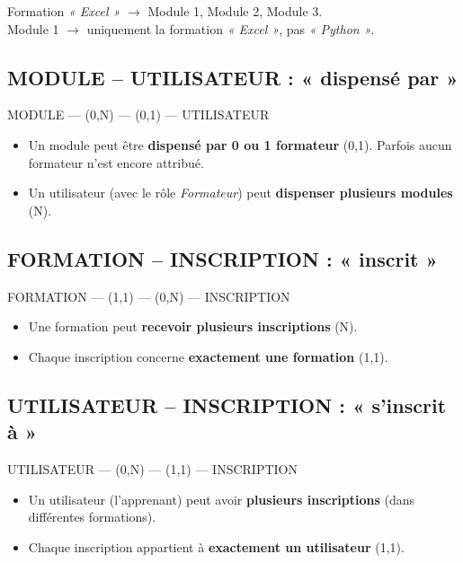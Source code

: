 \documentclass[12pt,a4paper]{article}
\begin{document}
\begin{exemplebox}
    \small
    Formation \textit{« Excel »} \(\rightarrow\) Module 1, Module 2, Module 3. \\
    Module 1 \(\rightarrow\) uniquement la formation \textit{« Excel »}, pas \textit{« Python »}.
\end{exemplebox}

\subsection{MODULE -- UTILISATEUR : « dispensé par »}


MODULE --- (0,N) --- (0,1) --- UTILISATEUR


\begin{itemize}
    \item Un module peut être \textbf{dispensé par 0 ou 1 formateur} (0,1). Parfois aucun formateur n'est encore attribué.
    \item Un utilisateur (avec le rôle \textit{Formateur}) peut \textbf{dispenser plusieurs modules} (N).
\end{itemize}

\subsection{FORMATION -- INSCRIPTION : « inscrit »}


FORMATION --- (1,1) --- (0,N) --- INSCRIPTION


\begin{itemize}
    \item Une formation peut \textbf{recevoir plusieurs inscriptions} (N).
    \item Chaque inscription concerne \textbf{exactement une formation} (1,1).
\end{itemize}

\subsection{UTILISATEUR -- INSCRIPTION : « s'inscrit à »}


UTILISATEUR --- (0,N) --- (1,1) --- INSCRIPTION


\begin{itemize}
    \item Un utilisateur (l'apprenant) peut avoir \textbf{plusieurs inscriptions} (dans différentes formations).
    \item Chaque inscription appartient à \textbf{exactement un utilisateur} (1,1).
\end{itemize}
\end{document}
